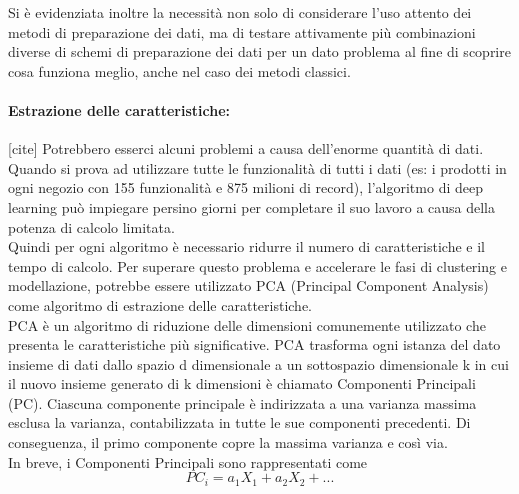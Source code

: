 \documentclass[12pt,a4paper]{report}
\begin{document}
Si è evidenziata inoltre la necessità non solo di considerare l'uso attento dei metodi di preparazione dei dati, ma di testare attivamente più combinazioni diverse di schemi di preparazione dei dati per un dato problema al fine di scoprire cosa funziona meglio, anche nel caso dei metodi classici.\\

\paragraph*{Estrazione delle caratteristiche:} [cite]
Potrebbero esserci alcuni problemi a causa dell'enorme quantità di dati. Quando si prova ad utilizzare tutte le funzionalità di tutti i dati (es: i prodotti in ogni negozio con 155 funzionalità e 875 milioni di record), l'algoritmo di deep learning può impiegare persino giorni per completare il suo lavoro a causa della potenza di calcolo limitata. \cite{kilimci2019improved}\\
Quindi per ogni algoritmo è necessario ridurre il numero di caratteristiche e il tempo di calcolo. Per superare questo problema e accelerare le fasi di clustering e modellazione, potrebbe essere utilizzato PCA (Principal Component Analysis) come algoritmo di estrazione delle caratteristiche.\\
PCA è un algoritmo di riduzione delle dimensioni comunemente utilizzato che presenta le caratteristiche più significative. PCA trasforma ogni istanza del dato insieme di dati dallo spazio d dimensionale a un sottospazio dimensionale k in cui il nuovo insieme generato di k dimensioni è chiamato Componenti Principali (PC). Ciascuna componente principale è indirizzata a una varianza massima esclusa la varianza, contabilizzata in tutte le sue componenti precedenti. Di conseguenza, il primo componente copre la massima varianza e così via.\\
In breve, i Componenti Principali sono rappresentati come
\begin{equation}
    {\displaystyle PC_i = a_1X_1 + a_2X_2 + ...}
\end{equation}
\end{document}
